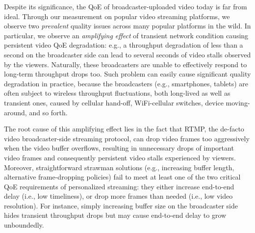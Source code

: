 %
%

Despite its significance, the QoE of broadcaster-uploaded video today 
is far from ideal. Through our measurement on popular video streaming 
platforms, we observe two {\em prevalent} quality issues across many 
popular platforms in the wild. In particular, we observe an 
{\em amplifying effect} of transient network condition causing persistent 
video QoE degradation: e.g., a throughput degradation of less than a 
second on the broadcaster side can lead to several seconds of video stalls 
observed by the viewers. Naturally, these broadcasters are unable 
to effectively respond to long-term throughput drops too.
Such problem can easily cause significant quality degradation in practice, 
because the broadcasters (e.g., smartphones, tablets) are often subject to 
wireless throughput fluctuations, both
long-lived as well as transient ones, caused by cellular hand-off, 
WiFi-cellular switches, device moving-around, and so forth.


The root cause of this amplifying effect lies in the fact that RTMP, 
the de-facto video broadcaster-side streaming protocol, can drop video frames 
too aggressively when the video buffer overflows, resulting in unnecessary 
drops of important video frames and consequently persistent video stalls 
experienced by viewers.
Moreover, straightforward strawman solutions (e.g., increasing
buffer length, alternative frame-dropping policies) fail to meet at least one
of the two critical QoE requirements of personalized streaming:
they either increase end-to-end delay (i.e., low timeliness), or drop more
frames than needed (i.e., low video resolution).
For instance, simply increasing buffer size on the broadcaster
side hides transient throughput drops but may cause end-to-end
delay to grow unboundedly.

